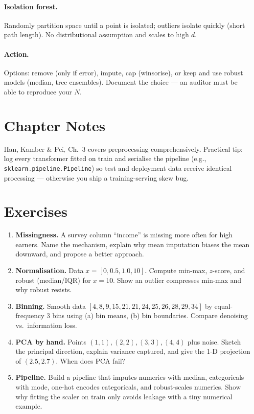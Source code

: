 \paragraph{Isolation forest.} Randomly partition space until a point is isolated; outliers isolate quickly (short path length). No distributional assumption and scales to high $d$.

\paragraph{Action.} Options: remove (only if error), impute, cap (winsorise), or keep and use robust models (median, tree ensembles). Document the choice --- an auditor must be able to reproduce your $N$.

\section{Chapter Notes}
Han, Kamber \& Pei, Ch.~3 covers preprocessing comprehensively. Practical tip: log every transformer fitted on train and serialise the pipeline (e.g., \texttt{sklearn.pipeline.Pipeline}) so test and deployment data receive identical processing --- otherwise you ship a training-serving skew bug.

\section{Exercises}
\begin{enumerate}[label=E2.\arabic*, leftmargin=*, itemsep=0.6em]
    \item \textbf{Missingness.} A survey column ``income'' is missing more often for high earners. Name the mechanism, explain why mean imputation biases the mean downward, and propose a better approach.
    \item \textbf{Normalisation.} Data $x=[0,0.5,1.0,10]$. Compute min-max, $z$-score, and robust (median/IQR) for $x=10$. Show an outlier compresses min-max and why robust resists.
    \item \textbf{Binning.} Smooth data $[4,8,9,15,21,21,24,25,26,28,29,34]$ by equal-frequency $3$ bins using (a) bin means, (b) bin boundaries. Compare denoising vs.\ information loss.
    \item \textbf{PCA by hand.} Points $(1,1),(2,2),(3,3),(4,4)$ plus noise. Sketch the principal direction, explain variance captured, and give the 1-D projection of $(2.5,2.7)$. When does PCA fail?
    \item \textbf{Pipeline.} Build a pipeline that imputes numerics with median, categoricals with mode, one-hot encodes categoricals, and robust-scales numerics. Show why fitting the scaler on train only avoids leakage with a tiny numerical example.
\end{enumerate}
